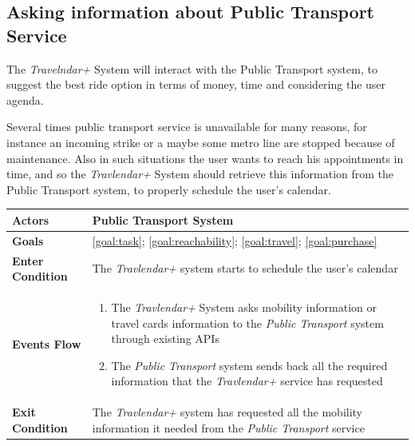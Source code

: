 \subsection{Asking information about Public Transport Service}
The \emph{Travelndar+} System will interact with the Public Transport system, to suggest the best ride option in terms of money, time and considering the user agenda.

Several times public transport service is unavailable for many reasons, for instance an incoming strike or a maybe some metro line are stopped because of maintenance. Also in such situations the user wants to reach his appointments in time, and so the \emph{Travlendar+} System should retrieve this information from the Public Transport system, to properly schedule the user's calendar. 

\begin{table}[H]
	\centering
    
    \begin{tabular}{|p{3.5cm}|p{10.3cm}|}
    
    \hline
    \textbf{\large{Actors}}  			& \tabitem Public Transport System\\
    
    \hline
    \textbf{\large{Goals}} 				& \ref{goal:task}; \ref{goal:reachability}; \ref{goal:travel}; \ref{goal:purchase} \\
    
    \hline
    \textbf{\large{Enter Condition}}	& The \emph{Travlendar+} system starts to schedule the user's calendar\\
    
    \hline
    \textbf{\large{Events Flow}}		& \begin{enumerate}[leftmargin=0.5cm]
                                          	\item The \emph{Travlendar+} System asks mobility information or travel cards information to the \emph{Public Transport} system through existing APIs
                                          	\item The \emph{Public Transport} system sends back all the required information that the \emph{Travlendar+} service has requested
                                          \end{enumerate}
    										\\
    \hline
    \textbf{\large{Exit Condition}} 	& The \emph{Travlendar+} system has requested all the mobility information it needed from the \emph{Public Transport} service\\
    

\end{tabular}
\end{table}
